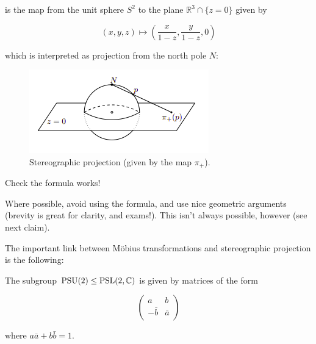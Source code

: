\documentclass[11pt]{scrartcl}
\begin{document}
\begin{definition}
 is the map from the unit sphere $S^2$ to the plane $\mathbb{R}^3 \cap \{ z=0 \}$ given by 

\begin{equation}
    (x,y,z) \mapsto \left( \frac{x}{1-z} , \frac{y}{1-z}, 0 \right)
\end{equation}

which is interpreted as projection from the north pole $N$:

\begin{figure}[h]
\centering
\includegraphics[scale=0.5]{Selection_228.png}
\caption{Stereographic projection (given by the map $\pi_+$).}
\label{fig:stereofig}
\end{figure}
\end{definition}

\begin{exercise}
Check the formula works!
\end{exercise}

\begin{remark}
Where possible, avoid using the formula, and use nice geometric arguments (brevity is great for clarity, and exams!). This isn't always possible, however (see next claim).
\end{remark}

The important link between M{\"o}bius transformations and stereographic projection is the following:

\begin{definition}
The subgroup $\text{PSU}(2) \le \text{PSL}(2,\mathbb C)$ is given by matrices of the form

\begin{equation}
    \begin{pmatrix}
    a & b \\
    -\bar{b} & \bar{a} \\
    \end{pmatrix}
\end{equation}

where $a\bar{a} + b\bar{b} = 1$.
\end{definition}
\end{document}

